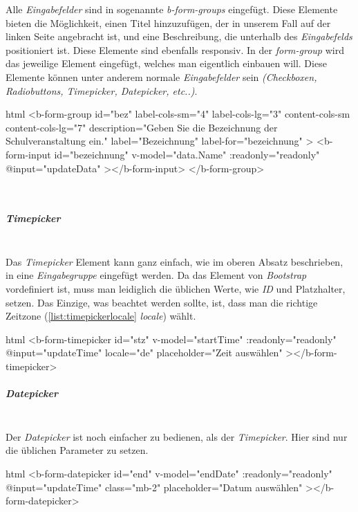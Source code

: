 Alle \textit{Eingabefelder} sind in sogenannte \textit{b-form-groups} eingefügt. Diese Elemente bieten die Möglichkeit, einen Titel hinzuzufügen, der in unserem Fall auf der linken Seite angebracht ist, und eine Beschreibung, die unterhalb des \textit{Eingabefelds} positioniert ist. Diese Elemente sind ebenfalls responsiv. In der \textit{form-group} wird das jeweilige Element eingefügt, welches man eigentlich einbauen will. Diese Elemente können unter anderem normale \textit{Eingabefelder} sein \textit{(Checkboxen, Radiobuttons, Timepicker, Datepicker, etc..)}.
\begin{code}{html}
	<b-form-group
        id="bez"
        label-cols-sm="4"
        label-cols-lg="3"
        content-cols-sm
        content-cols-lg="7"
        description="Geben Sie die Bezeichnung der Schulveranstaltung ein."
        label="Bezeichnung"
        label-for="bezeichnung"
    >
        <b-form-input
            id="bezeichnung"
            v-model="data.Name"
            :readonly="readonly"
            @input="updateData"
        ></b-form-input>
    </b-form-group>
\end{code}
~\\
\subparagraph{Timepicker}~\\
Das \textit{Timepicker} Element kann ganz einfach, wie im oberen Absatz beschrieben, in eine \textit{Eingabegruppe} eingefügt werden. Da das Element von \textit{Bootstrap} vordefiniert ist, muss man leidiglich die üblichen Werte, wie \textit{ID} und Platzhalter, setzen. Das Einzige, was beachtet werden sollte, ist, dass man die richtige Zeitzone (\autoref{list:timepickerlocale} \textit{locale}) wählt.
\begin{code}{html}
	<b-form-timepicker
		id="stz"
		v-model="startTime"
		:readonly="readonly"
		@input="updateTime"
		locale="de"
		placeholder="Zeit auswählen"
  	></b-form-timepicker>
\end{code}
\label{list:timepickerlocale}
\newpage
\subparagraph{Datepicker}~\\
Der \textit{Datepicker} ist noch einfacher zu bedienen, als der \textit{Timepicker}. Hier sind nur die üblichen Parameter zu setzen.
\begin{code}{html}
	<b-form-datepicker
		id="end"
		v-model="endDate"
		:readonly="readonly"
		@input="updateTime"
		class="mb-2"
		placeholder="Datum auswählen"
  	></b-form-datepicker>
\end{code}
	\label{list:bspinputgroup} ~\\
